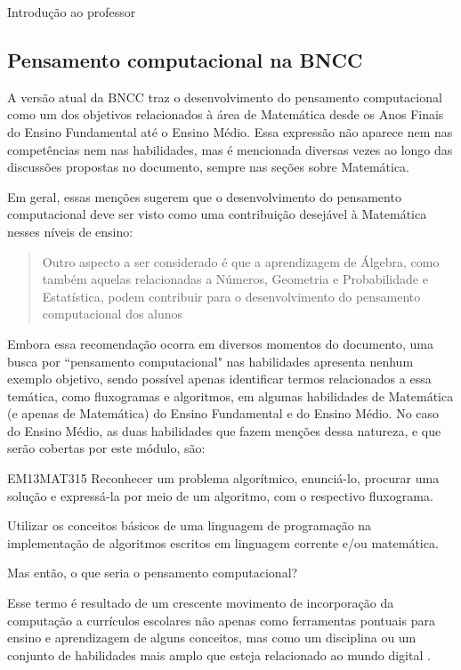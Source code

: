 \begin{apresentacao}{Introdução ao professor}
\subsection{Pensamento computacional na BNCC}

A versão atual da BNCC traz o desenvolvimento do pensamento computacional como um dos objetivos relacionados à área de Matemática desde os Anos Finais do Ensino Fundamental até o Ensino Médio. Essa expressão não aparece nem nas competências nem nas habilidades, mas é mencionada diversas vezes ao longo das discussões propostas no documento, sempre nas seções sobre Matemática.

Em geral, essas menções sugerem que o desenvolvimento do pensamento computacional deve ser visto como uma contribuição desejável à Matemática nesses níveis de ensino:

\begin{quote}
Outro aspecto a ser considerado é que a aprendizagem de Álgebra, como também aquelas relacionadas a Números, Geometria e Probabilidade e Estatística, podem contribuir para o desenvolvimento do pensamento computacional dos alunos \citep[BNCC,][p. 271]{BNCC2018}
\end{quote}

Embora essa recomendação ocorra em diversos momentos do documento, uma busca por ``pensamento computacional"{} nas habilidades apresenta nenhum exemplo objetivo, sendo possível apenas identificar termos relacionados a essa temática, como fluxogramas e algoritmos, em algumas habilidades de Matemática (e apenas de Matemática) do Ensino Fundamental e do Ensino Médio. No caso do Ensino Médio, as duas habilidades que fazem menções dessa natureza, e que serão cobertas por este módulo, são:

\begin{habilities}{EM13MAT315}
Reconhecer um problema algorítmico, enunciá-lo, procurar uma solução e expressá-la por meio de um algoritmo, com o respectivo fluxograma.

Utilizar os conceitos básicos de uma linguagem de programação na implementação de algoritmos escritos em linguagem corrente e/ou matemática.
\end{habilities}

Mas então, o que seria o pensamento computacional?

Esse termo é resultado de um crescente movimento de incorporação da computação a currículos escolares não apenas como ferramentas pontuais para ensino e aprendizagem de alguns conceitos, mas como um disciplina ou um conjunto de habilidades mais amplo que esteja relacionado ao mundo digital \citep{raabe2020}.


\end{apresentacao}
